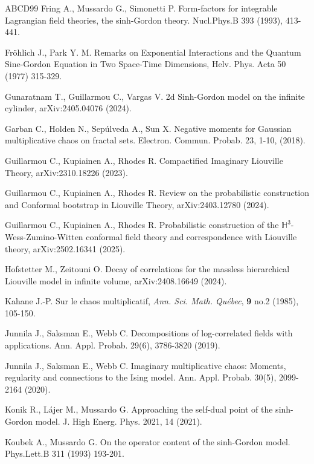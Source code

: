 \documentclass[11pt]{article}
\numberwithin{equation}{section}
\theoremstyle{definition}
\begin{document}
\begin{thebibliography}{ABCD99}
 Fring A., Mussardo G., Simonetti P. Form-factors for integrable Lagrangian field theories, the sinh-Gordon theory.  Nucl.Phys.B 393 (1993), 413-441.

 Fröhlich J., Park Y. M. Remarks on Exponential Interactions and the Quantum Sine-Gordon Equation in Two Space-Time Dimensions, Helv. Phys. Acta 50 (1977) 315-329.

 Gunaratnam T., Guillarmou C., Vargas V. 2d Sinh-Gordon model on the infinite cylinder, arXiv:2405.04076 (2024).

 Garban C., Holden N., Sepúlveda A., Sun X. Negative moments for Gaussian multiplicative chaos on fractal sets. Electron. Commun. Probab. 23, 1-10, (2018).

 Guillarmou C., Kupiainen A., Rhodes R. Compactified Imaginary Liouville Theory, arXiv:2310.18226 (2023).


 Guillarmou C., Kupiainen A., Rhodes R. Review on the probabilistic construction and Conformal bootstrap in Liouville Theory, arXiv:2403.12780 (2024).

 Guillarmou C., Kupiainen A., Rhodes R. Probabilistic construction of the $\mathbb{H}^3$-Wess-Zumino-Witten conformal field theory and correspondence with Liouville theory, arXiv:2502.16341 (2025).

 Hofstetter M., Zeitouni O. Decay of correlations for the massless hierarchical Liouville model in infinite volume, arXiv:2408.16649 (2024).

Kahane J.-P. Sur le chaos multiplicatif,
  \emph{Ann. Sci. Math. Qu{\'e}bec}, \textbf{9} no.2 (1985), 105-150.
  
 Junnila J., Saksman E., Webb C. Decompositions of log-correlated fields with applications.  Ann. Appl. Probab. 29(6), 3786-3820 (2019).

 Junnila J., Saksman E., Webb C. Imaginary multiplicative chaos: Moments, regularity and connections to the Ising model. Ann. Appl. Probab. 30(5), 2099-2164 (2020).

 Konik R., Lájer M., Mussardo G. Approaching the self-dual point of the sinh-Gordon model. J. High Energ. Phys. 2021, 14 (2021).

 Koubek A., Mussardo G. On the operator content of the sinh-Gordon model. Phys.Lett.B 311 (1993) 193-201.


\end{thebibliography}
\end{document}

